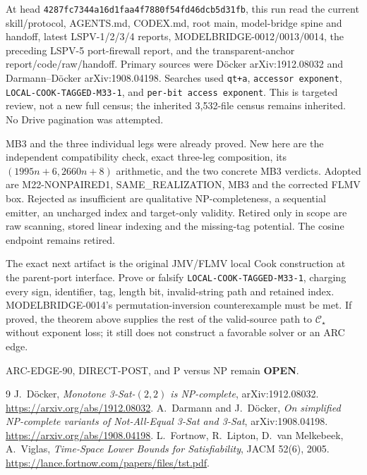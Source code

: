 \documentclass[11pt]{article}
\newcommand{\OPEN}{\textbf{OPEN}}
\begin{document}
At head \texttt{4287fc7344a16d1faa4f7880f54fd46dcb5d31fb}, this run read the
current skill/protocol, AGENTS.md, CODEX.md, root main, model-bridge spine
and handoff, latest LSPV-1/2/3/4 reports, MODELBRIDGE-0012/0013/0014, the
preceding LSPV-5 port-firewall report, and the transparent-anchor
report/code/raw/handoff.  Primary sources were D\"ocker
arXiv:1912.08032 and Darmann--D\"ocker arXiv:1908.04198.  Searches used
\texttt{qt+a}, \texttt{accessor exponent},
\texttt{LOCAL-COOK-TAGGED-M33-1}, and
\texttt{per-bit access exponent}.  This is targeted review, not a new full
census; the inherited 3,532-file census remains inherited.  No Drive
pagination was attempted.

MB3 and the three individual legs were already proved.  New here are the
independent compatibility check, exact three-leg composition, its
$(1995n+6,2660n+8)$ arithmetic, and the two concrete MB3 verdicts.
Adopted are M22-NONPAIRED1, SAME\_REALIZATION, MB3 and the corrected FLMV
box.  Rejected as insufficient are qualitative NP-completeness, a sequential
emitter, an uncharged index and target-only validity.  Retired only in scope
are raw scanning, stored linear indexing and the missing-tag potential.  The
cosine endpoint remains retired.

The exact next artifact is the original JMV/FLMV local Cook construction at
the parent-port interface.  Prove or falsify
\texttt{LOCAL-COOK-TAGGED-M33-1}, charging every sign, identifier, tag,
length bit, invalid-string path and retained index.  MODELBRIDGE-0014's
permutation-inversion counterexample must be met.  If proved, the theorem
above supplies the rest of the valid-source path to $\mathcal C_\star$
without exponent loss; it still does not construct a favorable solver or an
ARC edge.

ARC-EDGE-90, DIRECT-POST, and P versus NP remain \OPEN.

\begin{thebibliography}{9}
 J.~D\"ocker,
\emph{Monotone 3-Sat-$(2,2)$ is NP-complete}, arXiv:1912.08032.
\url{https://arxiv.org/abs/1912.08032}.
 A.~Darmann and J.~D\"ocker,
\emph{On simplified NP-complete variants of Not-All-Equal 3-Sat and 3-Sat},
arXiv:1908.04198. \url{https://arxiv.org/abs/1908.04198}.
 L.~Fortnow, R.~Lipton, D.~van Melkebeek, A.~Viglas,
\emph{Time-Space Lower Bounds for Satisfiability}, JACM 52(6), 2005.
\url{https://lance.fortnow.com/papers/files/tst.pdf}.
\end{thebibliography}

\end{document}
